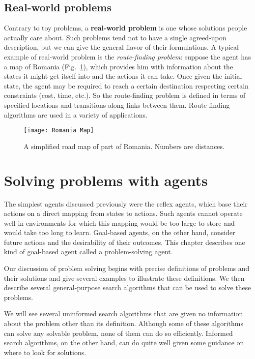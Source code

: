 \subsection{Real-world problems}
Contrary to toy problems, a \textbf{real-world problem} is one whose solutions people actually care about. Such problems tend not to have a single agreed-upon description, but we can give the general flavor of their formulations. A typical example of real-world problem is the \emph{route-finding problem}: suppose the agent has a map of Romania (Fig.~\ref{RomaniaMap}), which provides him with information about the states it might get itself into and the actions it can take. Once given the initial state, the agent may be required to reach a certain destination respecting certain constraints (cost, time, etc.). So the route-finding problem is defined in terms of specified locations and transitions along links between them. Route-finding algorithms are used in a variety of applications.
\begin{figure}[h!t]
\centering
\texttt{[image: Romania Map]}
\caption{A simplified road map of part of Romania. Numbers are distances.}\label{RomaniaMap}
\end{figure}

\section{Solving problems with agents}
The simplest agents discussed previously were the reflex agents, which base their actions on a direct mapping from states to actions. Such agents cannot operate well in environments for which this mapping would be too large to store and would take too long to learn. Goal-based agents, on the other hand, consider future actions and the desirability of their outcomes.
This chapter describes one kind of goal-based agent called a problem-solving agent.

Our discussion of problem solving begins with precise definitions of problems and their solutions and give several examples to illustrate these definitions. We then describe several general-purpose search algorithms that can be used to solve these problems.

We will see several uninformed search algorithms that are given no information about the problem other than its definition. Although some of these algorithms can solve any solvable problem, none of them can do so efficiently. Informed search algorithms, on the other hand, can do quite well given some guidance on where to look for solutions.
